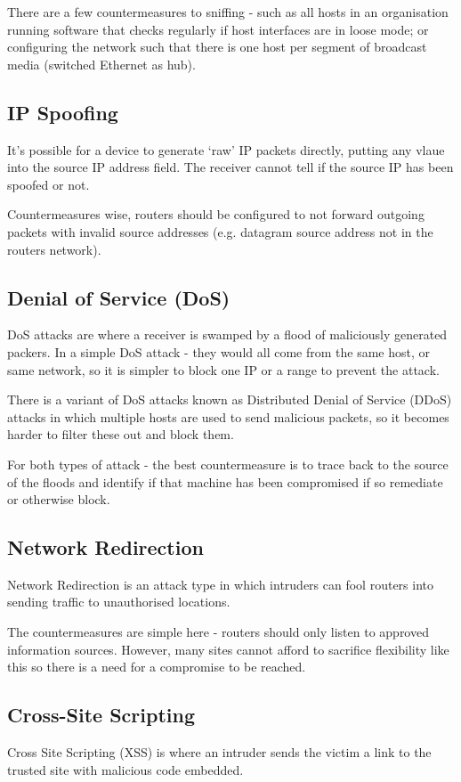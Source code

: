There are a few countermeasures to sniffing - such as all hosts in an organisation running software that checks regularly if host interfaces are in loose mode; or configuring the network such that there is one host per segment of broadcast media (switched Ethernet as hub). 

\subsection{IP Spoofing}
It's possible for a device to generate `raw' IP packets directly, putting any vlaue into the source IP address field. The receiver cannot tell if the source IP has been spoofed or not.

Countermeasures wise, routers should be configured to not forward outgoing packets with invalid source addresses (e.g. datagram source address not in the routers network).

\subsection{Denial of Service (DoS)}
DoS attacks are where a receiver is swamped by a flood of maliciously generated packers. In a simple DoS attack - they would all come from the same host, or same network, so it is simpler to block one IP or a range to prevent the attack.

There is a variant of DoS attacks known as Distributed Denial of Service (DDoS) attacks in which multiple hosts are used to send malicious packets, so it becomes harder to filter these out and block them. 

For both types of attack - the best countermeasure is to trace back to the source of the floods and identify if that machine has been compromised if so remediate or otherwise block. 

\subsection{Network Redirection}
Network Redirection is an attack type in which intruders can fool routers into sending traffic to unauthorised locations. 

The countermeasures are simple here - routers should only listen to approved information sources. However, many sites cannot afford to sacrifice flexibility like this so there is a need for a compromise to be reached. 

\subsection{Cross-Site Scripting}
Cross Site Scripting (XSS) is where an intruder sends the victim a link to the trusted site with malicious code embedded.

